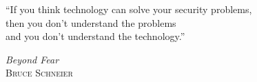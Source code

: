 
\vspace*{1cm}
\vfill

\epigraph{%
``If you think technology can solve your security problems,\\
then you don't understand the problems\\
and you don't understand the technology.''}%
{\textit{Beyond Fear} \\ \scshape{Bruce Schneier}}



